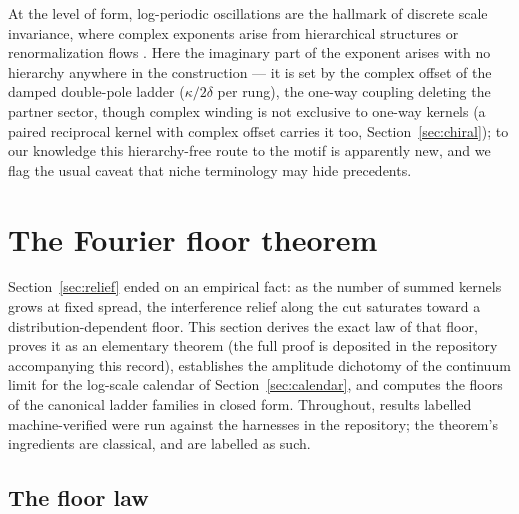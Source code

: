 \documentclass[11pt,a4paper]{article}
\begin{document}
At the level of form, log-periodic oscillations are the hallmark of
discrete scale invariance, where complex exponents arise from
hierarchical structures or renormalization flows
\cite{Sornette1998,Derrida1984}. Here the imaginary part of the exponent
arises with no hierarchy anywhere in the construction --- it is set by the
complex offset of the damped double-pole ladder ($\kappa/2\delta$ per
rung), the one-way coupling deleting the partner sector, though complex
winding is not
exclusive to one-way kernels (a paired reciprocal kernel with complex offset
carries it too, Section~\ref{sec:chiral}); to our knowledge this
hierarchy-free route to the motif is apparently new, and we flag the usual
caveat that niche terminology may hide precedents.



\section{The Fourier floor theorem}
\label{sec:floor}

Section~\ref{sec:relief} ended on an empirical fact: as the number of
summed kernels grows at fixed spread, the interference relief along the
cut saturates toward a distribution-dependent floor. This section derives
the exact law of that floor, proves it as an elementary theorem (the full
proof is deposited in the repository accompanying this record), establishes
the amplitude dichotomy of the continuum limit for the log-scale calendar
of Section~\ref{sec:calendar}, and computes the floors of the canonical ladder families
in closed form. Throughout, results labelled machine-verified were run
against the harnesses in the repository; the theorem's ingredients are
classical, and are labelled as such.

\subsection{The floor law}
\label{sec:floorlaw}
\end{document}
